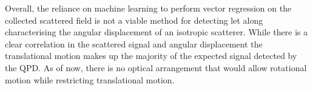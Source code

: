 Overall, the reliance on machine learning to perform vector 
regression on the collected scattered field is not a viable 
method for detecting let along characterising the angular 
displacement of an isotropic scatterer. While there is a 
clear correlation in the scattered signal and angular 
displacement the translational motion makes up the majority 
of the expected signal detected by the QPD. As of now, there
is no optical arrangement that would allow rotational motion 
while restricting translational motion. 

